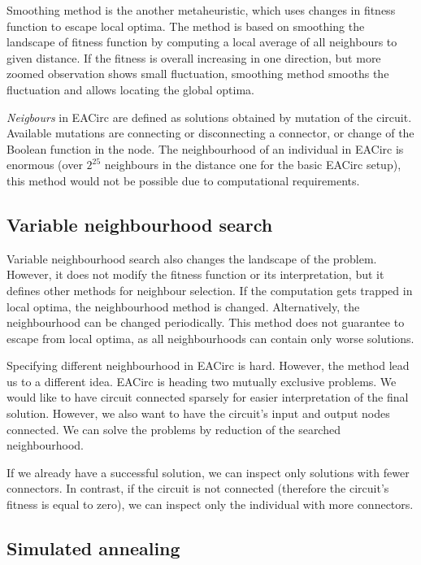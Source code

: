 \documentclass[
  print, %
  Table,   %
  nolof,     %
  nolot,     %
  11pt, %
  oneside  %
]{fithesis3}
\begin{document}
Smoothing method is the another metaheuristic, which uses changes in fitness function to escape local optima. The method is based on smoothing the landscape of fitness function by computing a local average of all neighbours to given distance. If the fitness is overall increasing in one direction, but more zoomed observation shows small fluctuation, smoothing method smooths the fluctuation and allows locating the global optima.

\textit{Neigbours} in EACirc are defined as solutions obtained by mutation of the circuit. Available mutations are connecting or disconnecting a connector, or change of the Boolean function in the node. The neighbourhood of an individual in EACirc is enormous (over $2^{25}$ neighbours in the distance one for the basic EACirc setup), this method would not be possible due to computational requirements.

\subsection{Variable neighbourhood search}
\label{subsec:opt-single-sol-vns}

Variable neighbourhood search also changes the landscape of the problem. However, it does not modify the fitness function or its interpretation, but it defines other methods for neighbour selection. If the computation gets trapped in local optima, the neighbourhood method is changed. Alternatively, the neighbourhood can be changed periodically. This method does not guarantee to escape from local optima, as all neighbourhoods can contain only worse solutions.

Specifying different neighbourhood in EACirc is hard. However, the method lead us to a different idea. EACirc is heading two mutually exclusive problems. We would like to have circuit connected sparsely for easier interpretation of the final solution. However, we also want to have the circuit's input and output nodes connected. We can solve the problems by reduction of the searched neighbourhood.

If we already have a successful solution, we can inspect only solutions with fewer connectors. In contrast, if the circuit is not connected (therefore the circuit's fitness is equal to zero), we can inspect only the individual with more connectors.

\subsection{Simulated annealing}
\label{subsec:opt-single-sol-sa}
\end{document}
